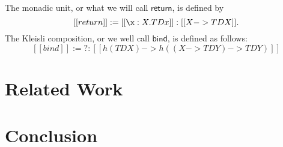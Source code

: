 \documentclass{article}
\begin{document}
The monadic unit, or what we will call $\mathsf{return}$, is defined by
\[ [[return]] := [[\x:X.T D x]] : [[X -> T D X]].\]
The Kleisli composition, or we well call $\mathsf{bind}$, is defined
as follows:
\[
[[bind]] := ? : [[h(T D X) -> h((X -> T D Y) -> T D Y)]]
\]

\section{Related Work}
\label{sec:related_work}

\section{Conclusion}
\label{sec:conclusion}




\nocite{*}
\appendix




\end{document}
